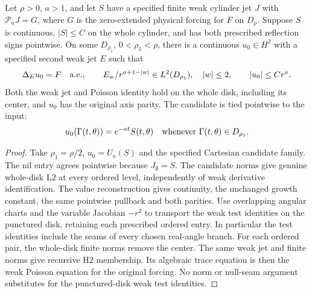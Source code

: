 \begin{lemma}
\label{lem:cylinder-cartesian-particular}
\leanok
Let $\rho>0$, $a>1$, and let $S$ have a specified finite weak cylinder jet $J$
with $\mathcal P_aJ=G$, where $G$ is the zero-extended physical forcing for
$F$ on $D_\rho$. Suppose $S$ is continuous, $|S|\le C$ on the whole cylinder,
and has both prescribed reflection signs pointwise.
On some $D_{\rho_1}$, $0<\rho_1<\rho$, there is a continuous $u_0\in H^2$
with a specified second weak jet $E$ such that
\[
 \Delta_Eu_0=F\quad\hbox{a.e.},\qquad
 E_w/r^{a+1-|w|}\in L^2(D_{\rho_1}),\quad |w|\le2,\qquad
 |u_0|\le Cr^a.
\]
Both the weak jet and Poisson identity hold on the whole disk, including its
center, and $u_0$ has the original axis parity.
The candidate is tied pointwise to the input:
\[
 u_0(\Gamma(t,\theta))=e^{-at}S(t,\theta)
 \quad\hbox{whenever }\Gamma(t,\theta)\in D_{\rho_1}.
\]
\end{lemma}

\begin{proof}
\leanok
Take $\rho_1=\rho/2$, $u_0=U_a(S)$ and the specified Cartesian candidate family.
The nil entry agrees pointwise because $J_\emptyset=S$.
The candidate norms give genuine whole-disk L2 at every ordered level,
independently of weak derivative identification.
The value reconstruction gives continuity, the unchanged growth constant,
the same pointwise pullback and both parities.
Use overlapping angular charts and the variable Jacobian $-r^2$ to transport
the weak test identities on the punctured disk, retaining each prescribed
ordered entry. In particular the test identities include the seams of every
chosen real-angle branch.
For each ordered pair, the whole-disk finite norms remove the center.
The same weak jet and finite norms give recursive H2 membership.
Its algebraic trace equation is then the weak Poisson equation for the
original forcing. No norm or null-seam argument substitutes for the
punctured-disk weak test identities.
\end{proof}

